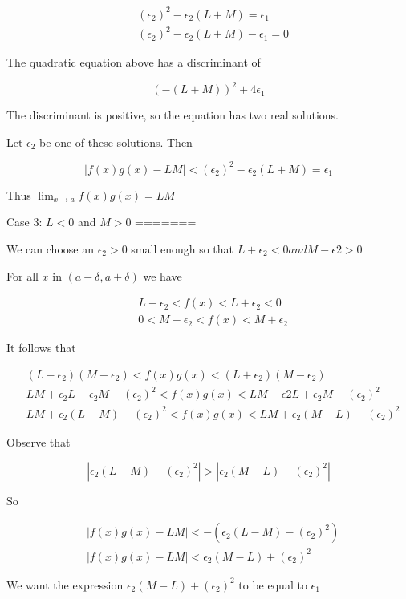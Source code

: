 \begin{align*}
& (\epsilon_2)^2 - \epsilon_2(L + M) = \epsilon_1 \\
& (\epsilon_2)^2 - \epsilon_2(L + M) - \epsilon_1 = 0
\end{align*}

The quadratic equation above has a discriminant of

    $$ (-(L + M))^2 + 4\epsilon_1 $$

The discriminant is positive, so the equation has two real solutions.

Let $\epsilon_2$ be one of these solutions. Then

    $$ |f(x)g(x) - LM| < (\epsilon_2)^2 - \epsilon_2(L + M) = \epsilon_1 $$

Thus $\lim_{x \rightarrow a} f(x)g(x) = LM$

Case 3: $L < 0$ and $M > 0$
=======

We can choose an $\epsilon_2 > 0$ small enough so that $L + \epsilon_2 < 0 and M - \epsilon2 > 0$

For all $x$ in $(a - \delta, a + \delta)$ we have

\begin{align*}
& L - \epsilon_2 < f(x) < L + \epsilon_2 < 0 \\
& 0 < M - \epsilon_2 < f(x) < M + \epsilon_2 
\end{align*}

It follows that

\begin{align*}
& (L - \epsilon_2)(M + \epsilon_2) < f(x)g(x) < (L + \epsilon_2)(M - \epsilon_2) \\
& LM + \epsilon_2L - \epsilon_2M - (\epsilon_2)^2 < f(x)g(x) < LM - \epsilon2L + \epsilon_2M - (\epsilon_2)^2 \\
& LM + \epsilon_2(L - M) - (\epsilon_2)^2 < f(x)g(x) < LM + \epsilon_2(M - L) - (\epsilon_2)^2
\end{align*}

Observe that

$$ |\epsilon_2(L - M) - (\epsilon_2)^2| > |\epsilon_2(M - L) - (\epsilon_2)^2| $$

So

\begin{align*}
& |f(x)g(x) - LM| < -(\epsilon_2(L - M) - (\epsilon_2)^2) \\
& |f(x)g(x) - LM| < \epsilon_2(M - L) + (\epsilon_2)^2
\end{align*}

We want the expression $\epsilon_2(M - L) + (\epsilon_2)^2$ to be equal to $\epsilon_1$

